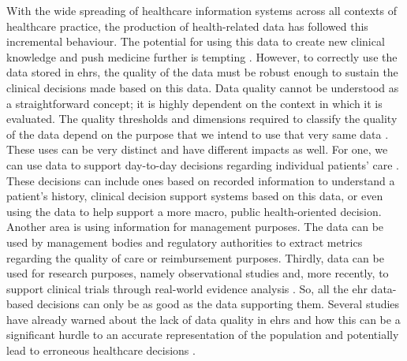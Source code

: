 
With the wide spreading of healthcare information systems across all contexts of healthcare practice, the production of health-related data has followed this incremental behaviour. The potential for using this data to create new clinical knowledge and push medicine further is tempting \cite{martin-sanchezBigDataMedicine2014}.
However, to correctly use the data stored in \acp{ehr}, the quality of the data must be robust enough to sustain the clinical decisions made based on this data. Data quality cannot be understood as a straightforward concept; it is highly dependent on the context in which it is evaluated. The quality thresholds and dimensions required to classify the quality of the data depend on the purpose that we intend to use that very same data \cite{waljiElectronicHealthRecords2019}. These uses can be very distinct and have different impacts as well. For one, we can use data to support day-to-day decisions regarding individual patients' care \cite{verheijPossibleSourcesBias2018}. These decisions can include ones based on recorded information to understand a patient's history, clinical decision support systems based on this data, or even using the data to help support a more macro, public health-oriented decision. Another area is using information for management purposes. The data can be used by management bodies and regulatory authorities to extract metrics regarding the quality of care or reimbursement purposes. Thirdly, data can be used for research purposes, namely observational studies and, more recently, to support clinical trials through real-world evidence analysis \cite{coreyAssessingQualitySurgical2020,verheijPossibleSourcesBias2018,wengClinicalDataQuality2020}. 
So, all the \ac{ehr} data-based decisions can only be as good as the data supporting them. Several studies have already warned about the lack of data quality in \acp{ehr} and how this can be a significant hurdle to an accurate representation of the population and potentially lead to erroneous healthcare decisions \cite{reimerDataQualityAssessment2016a,joukesImpactElectronicPaperBased2019a,huserMultisiteEvaluationData2016,zhangUnderstandingDetectingDefects2020,kramerImpactDataQuality2021,gigantiImpactDataQuality2019}.

